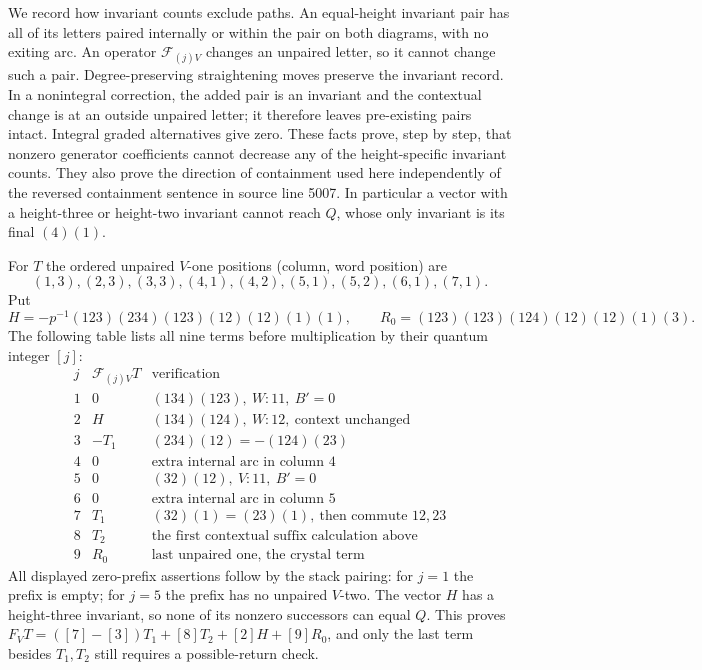 We record how invariant counts exclude paths. An equal-height
invariant pair has all of its letters paired internally or within
the pair on both diagrams, with no exiting arc. An operator
$\mathcal F_{(j)V}$ changes an unpaired letter, so it cannot change
such a pair. Degree-preserving straightening moves preserve the
invariant record. In a nonintegral correction, the added pair is
an invariant and the contextual change is at an outside unpaired
letter; it therefore leaves pre-existing pairs intact. Integral
graded alternatives give zero. These facts prove, step by step,
that nonzero generator coefficients cannot decrease any of the
height-specific invariant counts. They also prove the direction
of containment used here independently of the reversed containment
sentence in source line 5007. In particular a vector with a
height-three or height-two invariant cannot reach $Q$, whose only
invariant is its final $(4)(1)$.

For $T$ the ordered unpaired $V$-one positions (column, word position)
are
\[
 (1,3),(2,3),(3,3),(4,1),(4,2),(5,1),(5,2),(6,1),(7,1).
\]
Put
\[
 H=-p^{-1}(123)(234)(123)(12)(12)(1)(1),\qquad
 R_0=(123)(123)(124)(12)(12)(1)(3).
\]
The following table lists all nine terms before multiplication by
their quantum integer $[j]$:
\[
\begin{array}{c|c|l}
j&\mathcal F_{(j)V}T&\text{verification}\\\hline
1&0&(134)(123),\ W:11,\ B'=0\\
2&H&(134)(124),\ W:12,\ \text{context unchanged}\\
3&-T_1&(234)(12)=-(124)(23)\\
4&0&\text{extra internal arc in column }4\\
5&0&(32)(12),\ V:11,\ B'=0\\
6&0&\text{extra internal arc in column }5\\
7&T_1&(32)(1)=(23)(1),\ \text{then commute }12,23\\
8&T_2&\text{the first contextual suffix calculation above}\\
9&R_0&\text{last unpaired one, the crystal term}
\end{array}
\]
All displayed zero-prefix assertions follow by the stack pairing:
for $j=1$ the prefix is empty; for $j=5$ the prefix has no unpaired
$V$-two. The vector $H$ has a height-three invariant, so none of its
nonzero successors can equal $Q$. This proves
$F_VT=([7]-[3])T_1+[8]T_2+[2]H+[9]R_0$, and only the last term
besides $T_1,T_2$ still requires a possible-return check.

